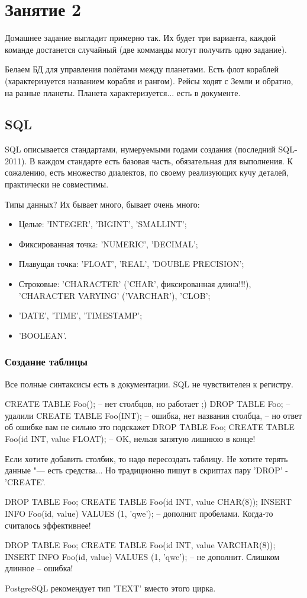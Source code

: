 \chapter{Занятие 2}

Домашнее задание выгладит примерно так.
Их будет три варианта, каждой команде достанется случайный (две комманды могут получить одно задание).

Белаем БД для управления полётами между планетами.
Есть флот кораблей (характеризуется названием корабля и рангом).
Рейсы ходят с Земли и обратно, на разные планеты. Планета характеризуется... \TODO есть в документе.

\section{SQL}

SQL описывается стандартами, нумеруемыми годами создания (последний SQL-2011).
В каждом стандарте есть базовая часть, обязательная для выполнения.
К сожалению, есть множество диалектов, по своему реализующих кучу деталей, практически не совместимы.

Типы данных? Их бывает много, бывает очень много:
\begin{itemize}
\item Целые: \sql'INTEGER', \sql'BIGINT', \sql'SMALLINT';
\item Фиксированная точка: \sql'NUMERIC', \sql'DECIMAL';
\item Плавущая точка: \sql'FLOAT', \sql'REAL', \sql'DOUBLE PRECISION';
\item Строковые: \sql'CHARACTER' (\sql'CHAR', фиксированная длина!!!), \sql'CHARACTER VARYING' (\sql'VARCHAR'), \sql'CLOB';
\item \sql'DATE', \sql'TIME', \sql'TIMESTAMP';
\item \sql'BOOLEAN'.
\end{itemize}

\subsection{Создание таблицы}
Все полные синтаксисы есть в документации.
SQL не чувствителен к регистру.
\begin{sqlcode}
CREATE TABLE Foo(); -- нет столбцов, но работает ;)
DROP TABLE Foo; -- удалили
CREATE TABLE Foo(INT); -- ошибка, нет названия столбца,
-- но ответ об ошибке вам не сильно это подскажет
DROP TABLE Foo;
CREATE TABLE Foo(id INT, value FLOAT); -- OK, нельзя запятую лишнюю в конце!
\end{sqlcode}
Если хотите добавить столбик, то надо пересоздать таблицу. Не хотите терять данные "--- есть средства...
Но традиционно пишут в скриптах пару \sql'DROP' - \sql'CREATE'.
\begin{sqlcode}
DROP TABLE Foo; CREATE TABLE Foo(id INT, value CHAR(8));
INSERT INFO Foo(id, value) VALUES (1, 'qwe');
-- дополнит пробелами. Когда-то считалось эффективнее!

DROP TABLE Foo; CREATE TABLE Foo(id INT, value VARCHAR(8));
INSERT INFO Foo(id, value) VALUES (1, 'qwe');
-- не дополнит. Слишком длинное -- ошибка!
\end{sqlcode}
PostgreSQL рекомендует тип \sql'TEXT' вместо этого цирка.

